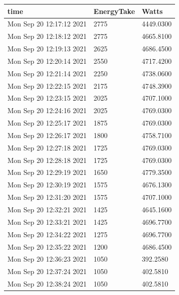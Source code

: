 \begin{longtable}{|l|l|l|}
\hline
time & EnergyTake & Watts  \\ \hline
\endhead
%
Mon Sep 20 12:17:12 2021 &               2775 &       4449.0300 \\ \hline
Mon Sep 20 12:18:12 2021 &               2775 &       4665.8100 \\ \hline
Mon Sep 20 12:19:13 2021 &               2625 &       4686.4500 \\ \hline
Mon Sep 20 12:20:14 2021 &               2550 &       4717.4200 \\ \hline
Mon Sep 20 12:21:14 2021 &               2250 &       4738.0600 \\ \hline
Mon Sep 20 12:22:15 2021 &               2175 &       4748.3900 \\ \hline
Mon Sep 20 12:23:15 2021 &               2025 &       4707.1000 \\ \hline
Mon Sep 20 12:24:16 2021 &               2025 &       4769.0300 \\ \hline
Mon Sep 20 12:25:17 2021 &               1875 &       4769.0300 \\ \hline
Mon Sep 20 12:26:17 2021 &               1800 &       4758.7100 \\ \hline
Mon Sep 20 12:27:18 2021 &               1725 &       4769.0300 \\ \hline
Mon Sep 20 12:28:18 2021 &               1725 &       4769.0300 \\ \hline
Mon Sep 20 12:29:19 2021 &               1650 &       4779.3500 \\ \hline
Mon Sep 20 12:30:19 2021 &               1575 &       4676.1300 \\ \hline
Mon Sep 20 12:31:20 2021 &               1575 &       4707.1000 \\ \hline
Mon Sep 20 12:32:21 2021 &               1425 &       4645.1600 \\ \hline
Mon Sep 20 12:33:21 2021 &               1425 &       4696.7700 \\ \hline
Mon Sep 20 12:34:22 2021 &               1275 &       4696.7700 \\ \hline
Mon Sep 20 12:35:22 2021 &               1200 &       4686.4500 \\ \hline
Mon Sep 20 12:36:23 2021 &               1050 &        392.2580 \\ \hline
Mon Sep 20 12:37:24 2021 &               1050 &        402.5810 \\ \hline
Mon Sep 20 12:38:24 2021 &               1050 &        402.5810 \\ \hline

\end{longtable}
